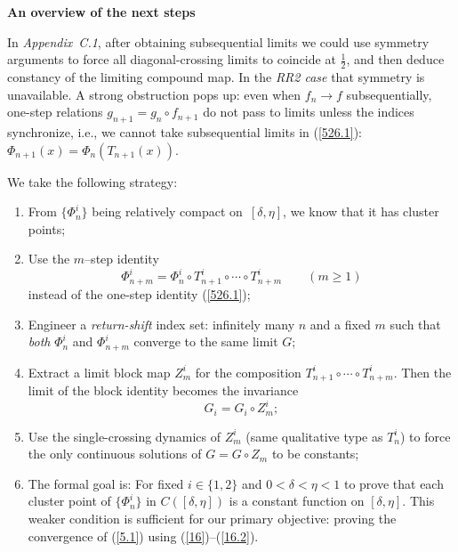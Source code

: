 \documentclass[onecolumn]{article}
\begin{document}
\begin{flushleft}
\textbf{An overview of the next steps}
\end{flushleft}

In \textit{Appendix~C.1}, after obtaining subsequential limits we could use
symmetry arguments to force all diagonal-crossing limits to coincide at $%
\frac{1}{2}$, and then deduce constancy of the limiting compound map. In the 
\textit{RR2 case} that symmetry is unavailable. A strong obstruction pops
up: even when $f_{n}\rightarrow f$ subsequentially, one-step relations $%
g_{n+1}=g_{n}\circ f_{n+1}$ do not pass to limits unless the indices
synchronize, i.e., we cannot take subsequential limits in (\ref{526.1}): $%
\Phi _{n+1}(x)=\Phi _{n}(T_{n+1}(x)).$

\medskip \noindent We take the following strategy:

\begin{enumerate}
\item From \emph{$\{\Phi _{n}^{i}\}$ }being relatively compact on\emph{\ $%
[\delta ,\eta ]$}, we know that it has cluster points;

\item Use the $m$--step identity 
\begin{equation}
\Phi _{n+m}^{i}=\Phi _{n}^{i}\circ T_{n+1}^{i}\circ \cdots \circ
T_{n+m}^{i}\qquad (m\geq 1)  \label{1000}
\end{equation}%
instead of the one-step identity (\ref{526.1});

\item Engineer a \textit{return-shift} index set: infinitely many $n$ and a
fixed $m$ such that \emph{both} $\Phi _{n}^{i}$ and $\Phi _{n+m}^{i}$
converge to the same limit $G$;

\item Extract a limit block map $Z_{m}^{i}$ for the composition $%
T_{n+1}^{i}\circ \cdots \circ T_{n+m}^{i}$. Then the limit of the block
identity becomes the invariance 
\begin{equation}
G_{i}=G_{i}\circ Z_{m}^{i};  \label{1001}
\end{equation}

\item Use the single-crossing dynamics of $Z_{m}^{i}$ (same qualitative type
as $T_{n}^{i}$) to force the only continuous solutions of $G=G\circ Z_{m}$
to be constants;

\item The formal goal is: For fixed $i\in \{1,2\}$ and $0<\delta <\eta <1$
to prove that each cluster point of $\{\Phi _{n}^{i}\}$ in $C([\delta ,\eta
])$ is a constant function on $[\delta ,\eta ]$. This weaker condition is
sufficient for our primary objective: proving the convergence of (\ref{5.1})
using (\ref{16})--(\ref{16.2}).
\end{enumerate}
\end{document}
